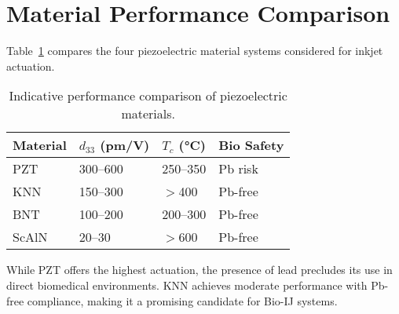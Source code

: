 \section{Material Performance Comparison}

Table~\ref{tab:piezo_compare} compares the four piezoelectric material systems
considered for inkjet actuation.

\begin{table}[htbp]
\centering
\caption{Indicative performance comparison of piezoelectric materials.}
\label{tab:piezo_compare}
\begin{tabular}{|l|l|l|l|}
\hline
Material & $d_{33}$ (pm/V) & $T_c$ (°C) & Bio Safety \\
\hline
PZT   & 300--600 & 250--350 & Pb risk \\
KNN   & 150--300 & $>$400   & Pb-free \\
BNT   & 100--200 & 200--300 & Pb-free \\
ScAlN & 20--30   & $>$600   & Pb-free \\
\hline
\end{tabular}
\end{table}

While PZT offers the highest actuation, the presence of lead
precludes its use in direct biomedical environments.
KNN achieves moderate performance with Pb-free compliance,
making it a promising candidate for Bio-IJ systems.

